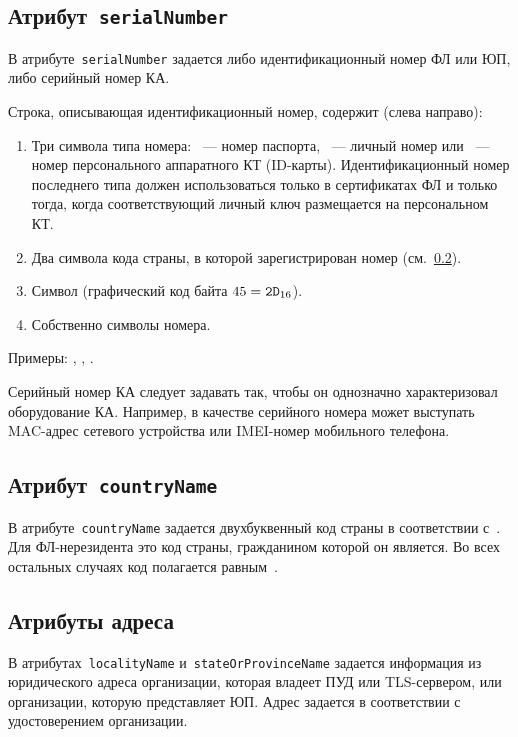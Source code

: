 \subsection{Атрибут~\texttt{serialNumber}}\label{ENTITIES.Id.SN}

В атрибуте~\texttt{serialNumber} задается либо идентификационный номер ФЛ 
или ЮП, либо серийный номер КА. 

Строка, описывающая идентификационный номер, содержит (слева направо):
\begin{enumerate}
\item
Три символа типа номера:
~--- номер паспорта, 
~--- личный номер или
~--- номер персонального аппаратного КТ (ID-карты).
%
Идентификационный номер последнего типа должен использоваться 
только в сертификатах ФЛ и только тогда, когда соответствующий личный 
ключ размещается на персональном КТ.

\item
Два символа кода страны, в которой зарегистрирован номер 
(см.~\ref{ENTITIES.Id.C}).
\item
Символ \str{-} (графический код байта $45=\texttt{2D}_{16}$).
\item
Собственно символы номера.
\end{enumerate}

Примеры: , 
, 
.

Серийный номер КА следует задавать так, чтобы он однозначно 
характеризовал оборудование КА. Например, в качестве серийного номера 
может выступать MAC-адрес сетевого устройства или IMEI-номер мобильного 
телефона. 

\subsection{Атрибут~\texttt{countryName}}\label{ENTITIES.Id.C}

В атрибуте~\texttt{countryName} задается двухбуквенный код страны
в соответствии с~\cite{CountryCodes}. 
%
Для ФЛ-нерезидента это код страны, гражданином которой он является.
Во всех остальных случаях код полагается равным~.

\subsection{Атрибуты адреса}\label{ENTITIES.Id.L}

В атрибутах~\texttt{localityName} и~\texttt{stateOrProvinceName} 
задается информация из юридического адреса организации,
которая владеет ПУД или TLS-сервером, или организации, 
которую представляет ЮП.
%
Адрес задается в соответствии с удостоверением организации. 

